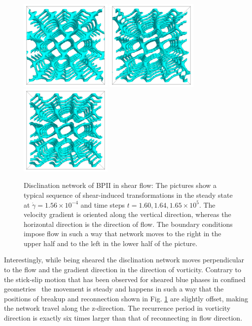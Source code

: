 \documentclass[aps,pre,reprint,superscriptaddress, twocolumn]{revtex4}
\newcommand{\e}[1]{\times10^{#1}}
\newcommand{\gd}{\dot{\gamma}}
\begin{document}
\begin{figure}[ht]
\includegraphics[width=0.4\textwidth]{disc-160k_run902.png}
\includegraphics[width=0.4\textwidth]{disc-164k_run902.png}
\includegraphics[width=0.4\textwidth]{disc-165k_run902.png}
\caption{Disclination network of BPII in shear flow: The pictures show a typical sequence 
of shear-induced transformations in the steady state at 
$\gd=1.56\e{-4}$ and time steps $t=1.60, 1.64,1.65\e{5}$. The velocity gradient 
is oriented along the vertical direction, whereas the horizontal direction is the direction of flow. 
The boundary conditions impose flow in such a way that network moves 
to the right in the upper half and to the left in the lower half of the picture.}
\label{bp2-med}
\end{figure}

Interestingly, while being sheared the disclination network moves perpendicular to the flow and 
the gradient direction in the direction of vorticity.
Contrary to the stick-slip motion that has been observed for sheared blue phases in confined
geometries~\cite{Henrich:2012b} the movement is steady and happens in such a way that the 
positions of breakup and reconnection shown in Fig. \ref{bp2-med} are slightly offset, 
making the network travel along the z-direction.
The recurrence period in vorticity direction is exactly six times larger than that of reconnecting in flow direction.
\end{document}
